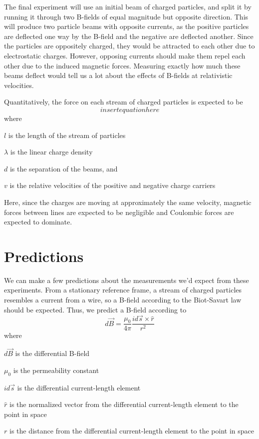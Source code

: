 \documentclass[12pt,letterpaper]{article}
\begin{document}
The final experiment will use an initial beam of charged particles, and split it by running it through two B-fields of equal magnitude but opposite direction.
This will produce two particle beams with opposite currents, as the positive particles are deflected one way by the B-field and the negative are deflected another.
Since the particles are oppositely charged, they would be attracted to each other due to electrostatic charges.
However, opposing currents should make them repel each other due to the induced magnetic forces. Measuring exactly how much these beams deflect would tell us a lot about the effects of B-fields at relativistic velocities.

Quantitatively, the force on each stream of charged particles is expected to be \[
insert equation here
\]
where
\begin{description}
\item $l$ is the length of the stream of particles
\item $\lambda$ is the linear charge density
\item $d$ is the separation of the beams, and 
\item $v$ is the relative velocities of the positive and negative charge carriers
\end{description}
Here, since the charges are moving at approximately the same velocity, magnetic forces between lines are expected to be negligible and Coulombic forces are expected to dominate.

\section{Predictions}

We can make a few predictions about the measurements we'd expect from these experiments. From a stationary reference frame, a stream of charged particles resembles a current from a wire, so a B-field according to the Biot-Savart law should be expected. Thus, we predict a B-field according to
\[
	d\vec{B} = \frac{\mu_0}{4\pi}\frac{id\vec{s} \times \hat{r}}{r^2}
\]
where
\begin{description}
	\item $d\vec{B}$ is the differential B-field
	\item $\mu_0$ is the permeability constant
	\item $id\vec{s}$ is the differential current-length element
	\item $\hat{r}$ is the normalized vector from the differential current-length element to the point in space
	\item $r$ is the distance from the differential current-length element to the point in space
\end{description}
\end{document}
